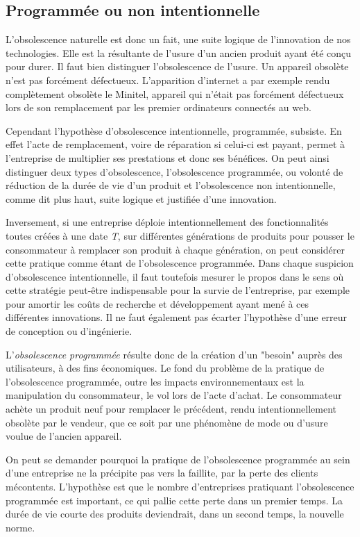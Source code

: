 \subsection{Programmée ou non intentionnelle}

L'obsolescence naturelle est donc un fait, une suite logique de l'innovation de nos technologies. Elle est la résultante de l'usure d'un ancien produit ayant été conçu pour durer.
Il faut bien distinguer l’obsolescence de l’usure. Un appareil obsolète n’est pas forcément défectueux. L’apparition d’internet a par exemple rendu complètement obsolète le Minitel, appareil qui n'était pas forcément défectueux lors de son remplacement par les premier ordinateurs connectés au web. 

\bigbreak
Cependant l'hypothèse d'obsolescence intentionnelle, programmée, subsiste. 
En effet l'acte de remplacement, voire de réparation si celui-ci est payant, permet à l'entreprise de multiplier ses prestations et donc ses bénéfices. 
On peut ainsi distinguer deux types d'obsolescence, l'obsolescence programmée, ou volonté de réduction de la durée de vie d’un produit et l'obsolescence non intentionnelle, comme dit plus haut, suite logique et justifiée d’une innovation.

\bigbreak
Inversement, si une entreprise déploie intentionnellement des fonctionnalités toutes créées à une date \textit{T}, sur différentes générations de produits pour pousser le consommateur à remplacer son produit à chaque génération, on peut considérer cette pratique comme étant de l'obsolescence programmée. Dans chaque suspicion d’obsolescence intentionnelle, il faut toutefois mesurer le propos dans le sens où cette stratégie peut-être indispensable pour la survie de l’entreprise, par exemple pour amortir les coûts de recherche et développement ayant mené à ces différentes innovations. Il ne faut également pas écarter l’hypothèse d’une erreur de conception ou d'ingénierie.

\medbreak
L'\textit{obsolescence programmée} résulte donc de la création d'un "besoin" auprès des utilisateurs, à des fins économiques. Le fond du problème de la pratique de l'obsolescence programmée, outre les impacts environnementaux est la manipulation du consommateur, le vol lors de l'acte d'achat. Le consommateur achète un produit neuf pour remplacer le précédent, rendu intentionnellement obsolète par le vendeur, que ce soit par une phénomène de mode ou d'usure voulue de l’ancien appareil.

\bigbreak
On peut se demander pourquoi la pratique de l’obsolescence programmée au sein d’une entreprise ne la précipite pas vers la faillite, par la perte des clients mécontents. L’hypothèse est que le nombre d’entreprises pratiquant l’obsolescence programmée est important, ce qui pallie cette perte dans un premier temps. La durée de vie courte des produits deviendrait, dans un second temps, la nouvelle norme.
